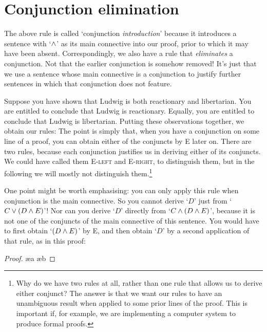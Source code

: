 \section{Conjunction elimination}\label{conjelim}

The above rule is called `conjunction \emph{introduction}' because it introduces a sentence with `$\wedge$' as its main connective into our proof, prior to which it may have been absent. Correspondingly, we also have a rule that \emph{eliminates} a conjunction. Not that the earlier conjunction is somehow removed! It's just that we use a sentence whose main connective is a conjunction to justify further sentences in which that conjunction does not feature.

Suppose you have shown that Ludwig is both reactionary and libertarian. You are entitled to conclude that Ludwig is reactionary. Equally, you are entitled to conclude that Ludwig is libertarian. Putting these observations together, we obtain our  rules:
The point is simply that, when you have a conjunction on some line of a proof, you can obtain either of the conjuncts by {\eand}E later on. There are two rules, because each conjunction justifies us in deriving either of its conjuncts. We could have called them {\eand}E-\textsc{left} and {\eand}E-\textsc{right}, to distinguish them, but in the following we will mostly not distinguish them.\footnote{Why do we have two rules at all, rather than one rule that allows us to derive either conjunct? The answer is that we want our rules to have an unambiguous result when applied to some prior lines of the proof. This is important if, for example, we are implementing a computer system to produce formal proofs.}


 One point might be worth emphasising: you can only apply this rule when conjunction is the main connective. So you cannot derive `$D$' just from `$C \vee (D \wedge E)$'! Nor can you derive `$D$' directly from `$C \wedge (D \wedge E)$', because it is not one of the conjuncts of the main connective of this sentence. You would have to first obtain `$(D \wedge E)$' by {\eand}E, and then obtain `$D$' by a second application of that rule, as in this proof: \begin{proof}
 	\ae{a}
 	\ae{b}
 \end{proof}


